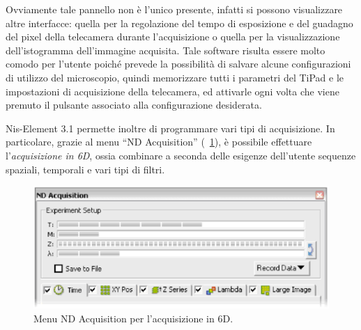 Ovviamente tale pannello non è l'unico presente, infatti si possono visualizzare altre interfacce: quella per la regolazione del tempo di esposizione e del guadagno del pixel della telecamera durante l'acquisizione o quella per la visualizzazione dell'istogramma dell'immagine acquisita.
Tale software risulta essere molto comodo per l'utente poiché prevede la possibilità di salvare alcune configurazioni di utilizzo del microscopio, quindi memorizzare tutti i parametri del TiPad e le impostazioni di acquisizione della telecamera, ed attivarle ogni volta che viene premuto il pulsante associato alla configurazione desiderata. 

Nis-Element 3.1 permette inoltre di programmare vari tipi di acquisizione. 
In particolare, grazie al menu ``ND Acquisition'' (\figurename~\ref{fig:6D}), è possibile effettuare l'\textit{acquisizione in 6D}, ossia combinare a seconda delle esigenze dell'utente sequenze spaziali, temporali e vari tipi di filtri. 

\begin{figure}
 \centering
 \includegraphics[scale=.60]{img/CAP26D.png}
 \caption{\small{Menu ND Acquisition per l'acquisizione in 6D.}}
 \label{fig:6D}
\end{figure}

